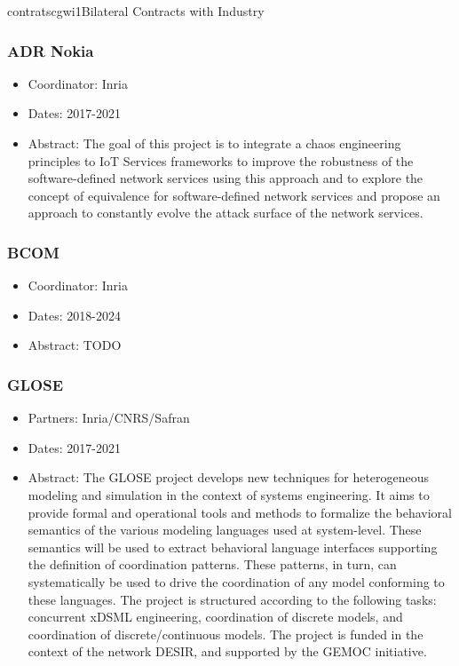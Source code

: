 \documentclass{ra2018}
\begin{document}
\begin{module}{contrats}{cgwi1}{Bilateral Contracts with Industry}

\subsubsection*{ADR Nokia}

\begin{itemize}
	\item Coordinator: Inria
	\item Dates: 2017-2021
	\item Abstract: The goal of this project is to integrate a chaos engineering principles to IoT Services frameworks to improve the robustness of the software-defined network services using this approach and to explore the concept of equivalence for software-defined network services and propose an approach to constantly evolve the attack surface of the network services.
\end{itemize}


\subsubsection*{BCOM}

\begin{itemize}
	\item Coordinator: Inria
	\item Dates: 2018-2024
	\item Abstract: TODO
\end{itemize}

\subsubsection*{GLOSE}
\begin{itemize}
	\item Partners: Inria/CNRS/Safran
	\item Dates: 2017-2021
	\item Abstract: The GLOSE project develops new techniques for heterogeneous modeling and simulation in the context of systems engineering. It aims to provide formal and operational tools and methods to formalize the behavioral semantics of the various modeling languages used at system-level. These semantics will be used to extract behavioral language interfaces supporting the definition of coordination patterns. These patterns, in turn, can systematically be used to drive the coordination of any model conforming to these languages. The project is structured according to the following tasks: concurrent xDSML engineering, coordination of discrete models, and coordination of discrete/continuous models. The project is funded in the context of the network DESIR, and supported by the GEMOC initiative.
\end{itemize}


\end{module}
\end{document}
